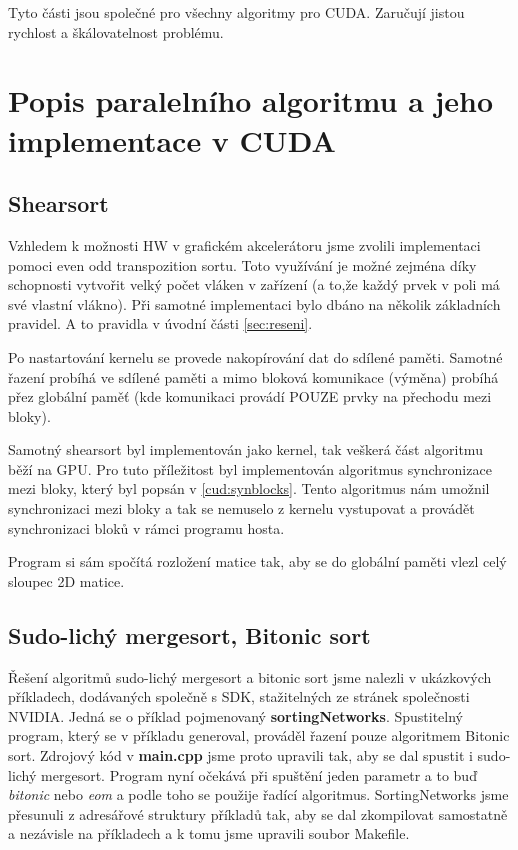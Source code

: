 \documentclass[12pt]{article}
\begin{document}
Tyto části jsou společné pro všechny algoritmy pro CUDA. Zaručují jistou rychlost a škálovatelnost problému.

\section{Popis paralelního algoritmu a jeho implementace v CUDA}
\subsection{Shearsort}
Vzhledem k možnosti HW v grafickém akcelerátoru jsme zvolili implementaci pomoci even odd transpozition sortu. Toto využívání je možné zejména díky schopnosti vytvořit velký počet vláken v zařízení (a to,že každý prvek v poli má své vlastní vlákno). Při samotné implementaci bylo dbáno na několik základních pravidel. A to pravidla v úvodní části \ref{sec:reseni}.

Po nastartování kernelu se provede nakopírování dat do sdílené paměti. Samotné řazení probíhá ve sdílené paměti a mimo bloková komunikace (výměna) probíhá přez globální paměť (kde komunikaci provádí POUZE prvky na přechodu mezi bloky). 

Samotný shearsort byl implementován jako kernel, tak veškerá část algoritmu běží na GPU. Pro tuto příležitost byl implementován algoritmus synchronizace mezi bloky, který byl popsán v \ref{cud:synblocks}. Tento algoritmus nám umožnil synchronizaci mezi bloky a tak se nemuselo z kernelu vystupovat a provádět synchronizaci bloků v rámci programu hosta.

Program si sám spočítá rozložení matice tak, aby se do globální paměti vlezl celý sloupec 2D matice.

\subsection{Sudo-lichý mergesort, Bitonic sort}
Řešení algoritmů sudo-lichý mergesort a bitonic sort jsme nalezli v ukázkových příkladech, dodávaných společně s SDK, stažitelných
ze stránek společnosti
NVIDIA. Jedná se o příklad pojmenovaný \textbf{sortingNetworks}. Spustitelný program, který se v příkladu generoval, prováděl
řazení pouze algoritmem Bitonic sort. Zdrojový kód v \textbf{main.cpp} jsme proto upravili tak, aby se dal spustit i sudo-lichý mergesort.
Program nyní očekává při spuštění jeden parametr a to buď \emph{bitonic} nebo \emph{eom} a podle toho se použije řadící algoritmus.
SortingNetworks jsme přesunuli z adresářové struktury příkladů tak, aby se dal zkompilovat samostatně a nezávisle na příkladech
a k tomu jsme upravili soubor Makefile.
\end{document}
